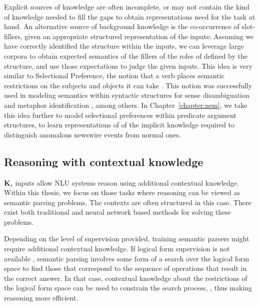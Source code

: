 Explicit sources of knowledge are often incomplete, or may not contain the kind of knowledge needed to fill the gaps to obtain representations need for the task at hand. 
An alternative source of background knowledge is the co-occurrence of slot-fillers, given an appropriate structured representation of the inputs:
Assuming we have correctly identified the structure within the inputs, we can leverage large corpora to obtain expected semantics of the fillers of the roles of
defined by the structure, and use those expectations to judge the given inputs.
This idea is very similar to Selectional Preference, the notion that a verb places semantic
restrictions on the subjects and objects it can take \citep{katz1963structure,wilks1975preferential}.
This notion was successfully used in modeling semantics within syntactic structures
for sense disambiguation \citep{resnik1997selectional} and metaphor identification \citep{shutova2013statistical}, among others.
In Chapter~\ref{chapter:nem}, we take this idea further to model selectional preferences within predicate argument structures, to learn representations
of of the implicit knowledge required to distinguish anomalous newswire events from normal ones.

\subsection{Reasoning with contextual knowledge}
$\textbf{K}_r$ inputs allow NLU systems reason using additional contextual knowledge. Within this thesis, we focus on those tasks where reasoning can be viewed as semantic parsing problems.
The contexts are often structured in this case. There exist both traditional \citep[among others]{Zelle1996LearningTP,Zettlemoyer2005LearningTM,zettlemoyer2007online} and neural network based methods
\citep{Dong2016LanguageTL,Andreas2016LearningTC,Liang2016NeuralSM,Neelakantan2016LearningAN} for solving these problems. 

Depending on the level of supervision provided, training semantic parsers might require additional contextual knowledge. If logical form supervision is not
available \citep{berant2013semantic,pasupat2015compositional,krishnamurthy2017neural}, semantic parsing involves some form of a search over the logical form space to find
those that correspond to the sequence of operations that result in the correct answer.
In that case, contextual knowledge about the restrictions of the logical form space can be used to constrain the search process, \citep{xiao2016sequence,krishnamurthy2017neural},
thus making reasoning more efficient.

